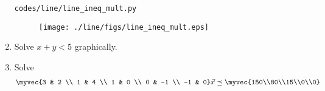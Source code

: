 \begin{enumerate}[label=\arabic*.,ref=\thesubsection.\theenumi]
\begin{lstlisting}
codes/line/line_ineq_mult.py
\end{lstlisting}
%
\begin{figure}[!ht]
\texttt{[image: ./line/figs/line\_ineq\_mult.eps]}
\caption{}
\label{fig:line_ineq_mult}
\end{figure}
%
\item   Solve    $x+y < 5$ graphically.
\\
\solution 

%
    \item Solve 
\begin{align}
\myvec{3 & 2 \\ 1 & 4 \\ 1 & 0 \\ 0 & -1 \\ -1 & 0} \vec{x}\preceq \myvec{150\\80\\15\\0\\0}
\end{align}
%
   
    \end{enumerate}
